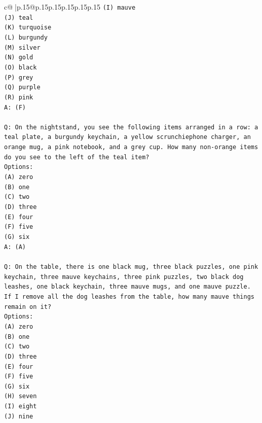 \documentclass{article}
\begin{document}
{\begin{supertabular}{c@{$\;$}|p{.15\linewidth}@{}p{.15\linewidth}p{.15\linewidth}p{.15\linewidth}p{.15\linewidth}p{.15\linewidth}}
{{{\texttt{(I) mauve} \\
\texttt{(J) teal} \\
\texttt{(K) turquoise} \\
\texttt{(L) burgundy} \\
\texttt{(M) silver} \\
\texttt{(N) gold} \\
\texttt{(O) black} \\
\texttt{(P) grey} \\
\texttt{(Q) purple} \\
\texttt{(R) pink} \\
\texttt{A: (F)} \\
\\ 
\texttt{Q: On the nightstand, you see the following items arranged in a row: a teal plate, a burgundy keychain, a yellow scrunchiephone charger, an orange mug, a pink notebook, and a grey cup. How many non{-}orange items do you see to the left of the teal item?} \\
\texttt{Options:} \\
\texttt{(A) zero} \\
\texttt{(B) one} \\
\texttt{(C) two} \\
\texttt{(D) three} \\
\texttt{(E) four} \\
\texttt{(F) five} \\
\texttt{(G) six} \\
\texttt{A: (A)} \\
\\ 
\texttt{Q: On the table, there is one black mug, three black puzzles, one pink keychain, three mauve keychains, three pink puzzles, two black dog leashes, one black keychain, three mauve mugs, and one mauve puzzle. If I remove all the dog leashes from the table, how many mauve things remain on it?} \\
\texttt{Options:} \\
\texttt{(A) zero} \\
\texttt{(B) one} \\
\texttt{(C) two} \\
\texttt{(D) three} \\
\texttt{(E) four} \\
\texttt{(F) five} \\
\texttt{(G) six} \\
\texttt{(H) seven} \\
\texttt{(I) eight} \\
\texttt{(J) nine} \\
}}}
\end{supertabular}}
\end{document}
